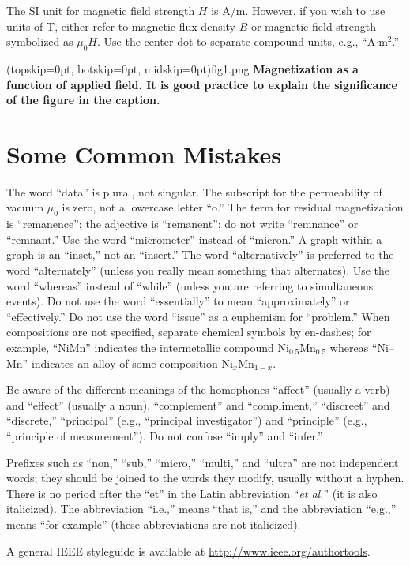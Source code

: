 \documentclass{ieeeaccess}
\begin{document}
The SI unit for magnetic field strength $H$ is A/m. However, if you wish to use
units of T, either refer to magnetic flux density $B$ or magnetic field
strength symbolized as $\mu _{0}H$. Use the center dot to separate
compound units, e.g., ``A$\cdot $m$^{2}$.''


\Figure[t!](topskip=0pt, botskip=0pt, midskip=0pt){fig1.png}
{ \textbf{Magnetization as a function of applied field.
        It is good practice to explain the significance of the figure in the caption.}\label{fig1}}

\section{Some Common Mistakes}
The word ``data'' is plural, not singular. The subscript for the
permeability of vacuum $\mu _{0}$ is zero, not a lowercase letter
``o.'' The term for residual magnetization is ``remanence''; the adjective
is ``remanent''; do not write ``remnance'' or ``remnant.'' Use the word
``micrometer'' instead of ``micron.'' A graph within a graph is an
``inset,'' not an ``insert.'' The word ``alternatively'' is preferred to the
word ``alternately'' (unless you really mean something that alternates). Use
the word ``whereas'' instead of ``while'' (unless you are referring to
simultaneous events). Do not use the word ``essentially'' to mean
``approximately'' or ``effectively.'' Do not use the word ``issue'' as a
euphemism for ``problem.'' When compositions are not specified, separate
chemical symbols by en-dashes; for example, ``NiMn'' indicates the
intermetallic compound Ni$_{0.5}$Mn$_{0.5}$ whereas
``Ni--Mn'' indicates an alloy of some composition
Ni$_{x}$Mn$_{1-x}$.

Be aware of the different meanings of the homophones ``affect'' (usually a
verb) and ``effect'' (usually a noun), ``complement'' and ``compliment,''
``discreet'' and ``discrete,'' ``principal'' (e.g., ``principal
investigator'') and ``principle'' (e.g., ``principle of measurement''). Do
not confuse ``imply'' and ``infer.''

Prefixes such as ``non,'' ``sub,'' ``micro,'' ``multi,'' and ``ultra'' are
not independent words; they should be joined to the words they modify,
usually without a hyphen. There is no period after the ``et'' in the Latin
abbreviation ``\emph{et al.}'' (it is also italicized). The abbreviation ``i.e.,'' means
``that is,'' and the abbreviation ``e.g.,'' means ``for example'' (these
abbreviations are not italicized).

A general IEEE styleguide is available at \break
\underline{http://www.ieee.org/authortools}.
\end{document}
